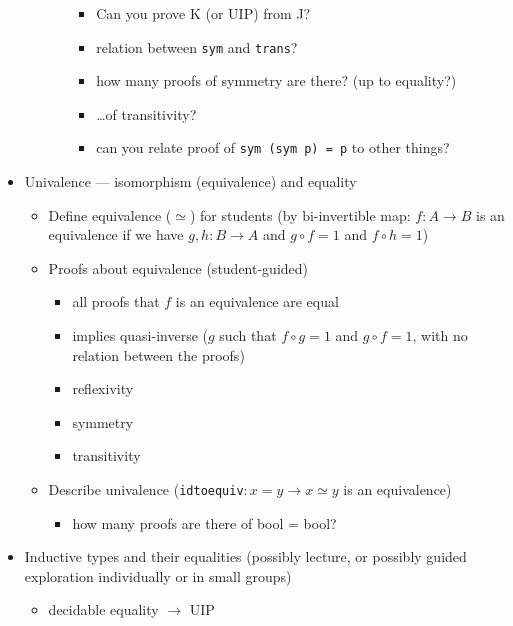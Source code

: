 \documentclass{article}
\begin{document}
\begin{itemize}
\begin{itemize}
\begin{itemize}
        \begin{itemize}
          \item Can you prove K (or UIP) from J?
          \item relation between \texttt{sym} and \texttt{trans}?
          \item how many proofs of symmetry are there? (up to equality?)
          \item \ldots\space of transitivity?
          \item can you relate proof of \texttt{sym (sym p) = p} to other things?
        \end{itemize}
      \end{itemize}
    \end{itemize}
    \item Univalence --- isomorphism (equivalence) and equality
    \begin{itemize}
      \item Define equivalence ($\simeq$) for students (by bi-invertible map: $f : A \to B$ is an equivalence if we have $g, h : B \to A$ and $g \circ f = 1$ and $f \circ h = 1$)
      \item Proofs about equivalence (student-guided)
      \begin{itemize}
        \item all proofs that $f$ is an equivalence are equal
        \item implies quasi-inverse ($g$ such that $f \circ g = 1$ and $g \circ f = 1$, with no relation between the proofs)
        \item reflexivity
        \item symmetry
        \item transitivity
      \end{itemize}
      \item Describe univalence (\texttt{idtoequiv}$ : x = y \to x \simeq y$ is an equivalence)
      \begin{itemize}
        \item how many proofs are there of bool = bool?
      \end{itemize}
    \end{itemize}
    \item Inductive types and their equalities (possibly lecture, or possibly guided exploration individually or in small groups)
    \begin{itemize}
      \item decidable equality $\to$ UIP
      \begin{itemize}

\end{itemize}
\end{itemize}
\end{itemize}
\end{document}

